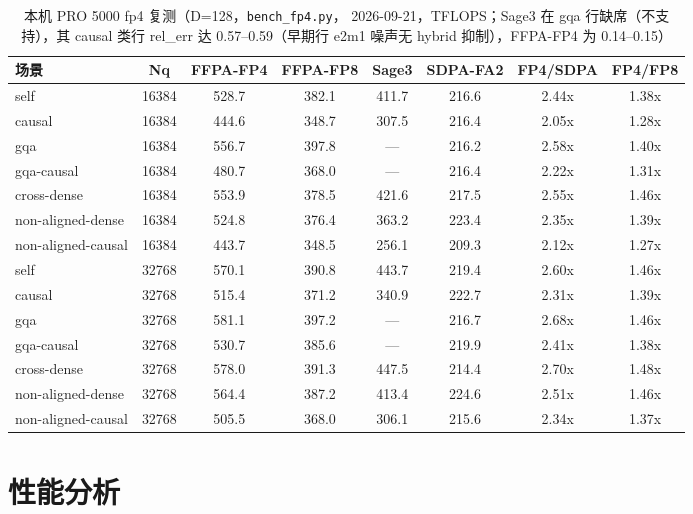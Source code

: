 \begin{table}[!htbp]
  \centering\small
  \caption{本机 PRO 5000 fp4 复测（D=128，\texttt{bench\_fp4.py}，
  2026-09-21，TFLOPS；Sage3 在 gqa 行缺席（不支持），其 causal 类行
  rel\_err 达 0.57--0.59（早期行 e2m1 噪声无 hybrid 抑制），FFPA-FP4
  为 0.14--0.15）}\label{tab:33-pro5000-fp4}
  \begin{tabular}{lccccccc}
    \toprule
    场景 & Nq & FFPA-FP4 & FFPA-FP8 & Sage3 & SDPA-FA2 & FP4/SDPA & FP4/FP8 \\
    \midrule
    self               & 16384 & 528.7 & 382.1 & 411.7 & 216.6 & 2.44x & 1.38x \\
    causal             & 16384 & 444.6 & 348.7 & 307.5 & 216.4 & 2.05x & 1.28x \\
    gqa                & 16384 & 556.7 & 397.8 & ---   & 216.2 & 2.58x & 1.40x \\
    gqa-causal         & 16384 & 480.7 & 368.0 & ---   & 216.4 & 2.22x & 1.31x \\
    cross-dense        & 16384 & 553.9 & 378.5 & 421.6 & 217.5 & 2.55x & 1.46x \\
    non-aligned-dense  & 16384 & 524.8 & 376.4 & 363.2 & 223.4 & 2.35x & 1.39x \\
    non-aligned-causal & 16384 & 443.7 & 348.5 & 256.1 & 209.3 & 2.12x & 1.27x \\
    \midrule
    self               & 32768 & 570.1 & 390.8 & 443.7 & 219.4 & 2.60x & 1.46x \\
    causal             & 32768 & 515.4 & 371.2 & 340.9 & 222.7 & 2.31x & 1.39x \\
    gqa                & 32768 & 581.1 & 397.2 & ---   & 216.7 & 2.68x & 1.46x \\
    gqa-causal         & 32768 & 530.7 & 385.6 & ---   & 219.9 & 2.41x & 1.38x \\
    cross-dense        & 32768 & 578.0 & 391.3 & 447.5 & 214.4 & 2.70x & 1.48x \\
    non-aligned-dense  & 32768 & 564.4 & 387.2 & 413.4 & 224.6 & 2.51x & 1.46x \\
    non-aligned-causal & 32768 & 505.5 & 368.0 & 306.1 & 215.6 & 2.34x & 1.37x \\
    \bottomrule
  \end{tabular}
\end{table}

\FloatBarrier

\section{性能分析}

